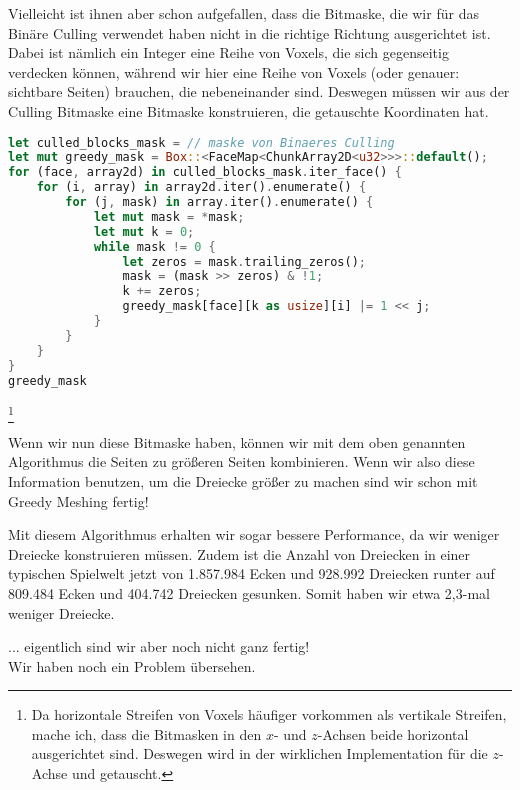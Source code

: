 Vielleicht ist ihnen aber schon aufgefallen,
dass die Bitmaske, die wir für das Binäre Culling
verwendet haben nicht in die richtige Richtung
ausgerichtet ist.
Dabei ist nämlich ein Integer eine Reihe von Voxels,
die sich gegenseitig verdecken können, während wir
hier eine Reihe von Voxels
(oder genauer: sichtbare Seiten)
brauchen, die nebeneinander sind.
Deswegen müssen wir aus der Culling Bitmaske
eine Bitmaske konstruieren,
die getauschte Koordinaten hat.

\begin{lstlisting}[language=Rust]
let culled_blocks_mask = // maske von Binaeres Culling
let mut greedy_mask = Box::<FaceMap<ChunkArray2D<u32>>>::default();
for (face, array2d) in culled_blocks_mask.iter_face() {
	for (i, array) in array2d.iter().enumerate() {
		for (j, mask) in array.iter().enumerate() {
			let mut mask = *mask;
			let mut k = 0;
			while mask != 0 {
				let zeros = mask.trailing_zeros();
				mask = (mask >> zeros) & !1;
				k += zeros;
				greedy_mask[face][k as usize][i] |= 1 << j;
			}
		}
	}
}
greedy_mask
\end{lstlisting}
\footnote{
	Da horizontale Streifen von Voxels häufiger
	vorkommen als vertikale Streifen, mache ich,
	dass die Bitmasken in den $x$- und $z$-Achsen
	beide horizontal ausgerichtet sind.
	Deswegen wird in der wirklichen Implementation
	für die $z$-Achse  und  getauscht.
}

Wenn wir nun diese Bitmaske haben, können wir mit dem
oben genannten Algorithmus die Seiten zu größeren
Seiten kombinieren.
Wenn wir also diese Information benutzen,
um die Dreiecke größer zu machen sind wir
schon mit Greedy Meshing fertig!

\vspace{0.5cm}


Mit diesem Algorithmus erhalten wir sogar bessere
Performance, da wir weniger Dreiecke konstruieren
müssen.
Zudem ist die Anzahl von Dreiecken in einer
typischen Spielwelt jetzt von
1.857.984 Ecken und 928.992 Dreiecken
runter auf 809.484 Ecken und 404.742 Dreiecken
gesunken.
Somit haben wir etwa 2,3-mal weniger Dreiecke.

\vspace{0.7cm}

{
	\setlength{\parindent}{0pt}
	... eigentlich sind wir aber noch nicht ganz fertig!\\
	Wir haben noch ein Problem übersehen.
}
